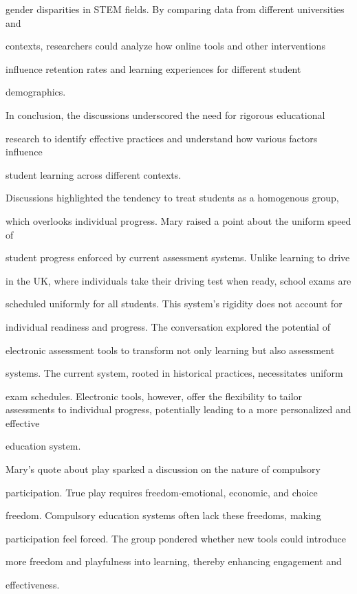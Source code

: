 \documentclass[11pt]{article}
\begin{document}
gender disparities in STEM fields. By comparing data from different universities and

contexts, researchers could analyze how online tools and other interventions

influence retention rates and learning experiences for different student

demographics.

In conclusion, the discussions underscored the need for rigorous educational

research to identify effective practices and understand how various factors influence

student learning across different contexts.

Discussions highlighted the tendency to treat students as a homogenous group,

which overlooks individual progress. Mary raised a point about the uniform speed of

student progress enforced by current assessment systems. Unlike learning to drive

in the UK, where individuals take their driving test when ready, school exams are

scheduled uniformly for all students. This system's rigidity does not account for

individual readiness and progress. The conversation explored the potential of

electronic assessment tools to transform not only learning but also assessment

systems. The current system, rooted in historical practices, necessitates uniform

exam schedules. Electronic tools, however, offer the flexibility to tailor assessments to individual progress, potentially leading to a more personalized and effective

education system.

Mary's quote about play sparked a discussion on the nature of compulsory

participation. True play requires freedom-emotional, economic, and choice

freedom. Compulsory education systems often lack these freedoms, making

participation feel forced. The group pondered whether new tools could introduce

more freedom and playfulness into learning, thereby enhancing engagement and

effectiveness.
\end{document}
